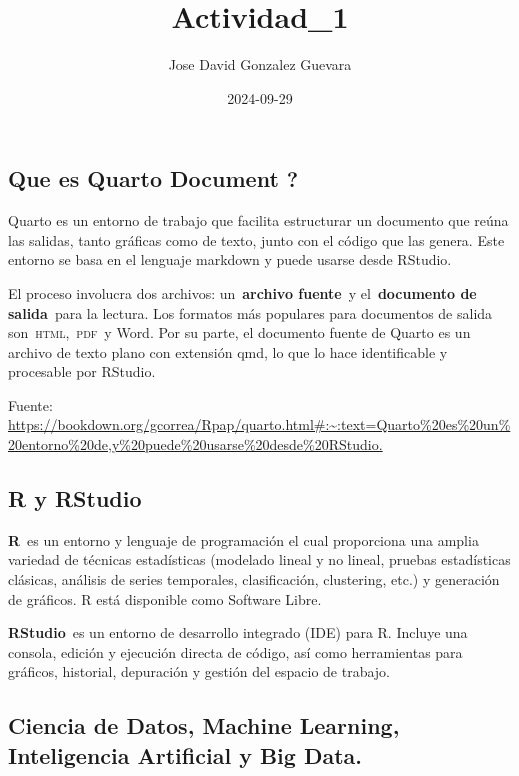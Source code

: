 \documentclass[
  letterpaper,
  DIV=11,
  numbers=noendperiod]{scrartcl}
\title{Actividad\_1}
\author{Jose David Gonzalez Guevara}
\date{2024-09-29}
\begin{document}
\maketitle

\subsection{Que es Quarto Document ?}\label{que-es-quarto-document}

Quarto es un entorno de trabajo que facilita estructurar un documento
que reúna las salidas, tanto gráficas como de texto, junto con el código
que las genera. Este entorno se basa en el lenguaje markdown y puede
usarse desde RStudio.

El proceso involucra dos archivos: un~\textbf{archivo fuente}~y
el~\textbf{documento de salida}~para la lectura. Los formatos más
populares para documentos de salida son~\textsc{html},~\textsc{pdf}~y
Word. Por su parte, el documento fuente de Quarto es un archivo de texto
plano con extensión qmd, lo que lo hace identificable y procesable por
RStudio.

Fuente:
\url{https://bookdown.org/gcorrea/Rpap/quarto.html\#:~:text=Quarto\%20es\%20un\%20entorno\%20de,y\%20puede\%20usarse\%20desde\%20RStudio.}

\subsection{R y RStudio}\label{r-y-rstudio}

\textbf{R}~es un entorno y lenguaje de programación el cual proporciona
una amplia variedad de técnicas estadísticas (modelado lineal y no
lineal, pruebas estadísticas clásicas, análisis de series temporales,
clasificación, clustering, etc.) y generación de gráficos. R está
disponible como Software Libre.

\textbf{RStudio}~es un entorno de desarrollo integrado (IDE) para R.
Incluye una consola, edición y ejecución directa de código, así como
herramientas para gráficos, historial, depuración y gestión del espacio
de trabajo.

\subsection{Ciencia de Datos, Machine Learning, Inteligencia Artificial
y Big
Data.}\label{ciencia-de-datos-machine-learning-inteligencia-artificial-y-big-data.}
\end{document}
